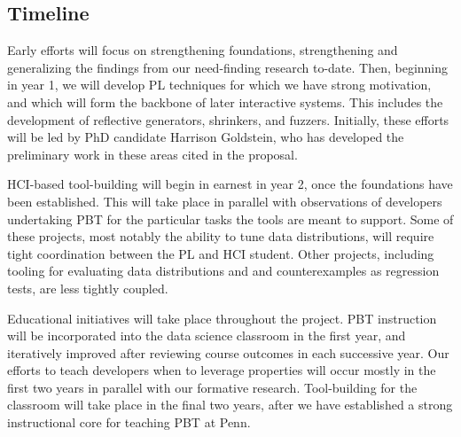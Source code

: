 \subsection*{Timeline}


\iflater
{}

Early efforts will focus on strengthening foundations, strengthening and
generalizing the findings from our need-finding research to-date. Then, beginning in
year 1, we will develop PL techniques for which we have strong
motivation, and which will form the backbone of later interactive systems. This
includes the development of reflective generators, shrinkers, and fuzzers.
Initially, these efforts will be led by PhD candidate Harrison Goldstein, who
has developed the preliminary work in these areas cited in the proposal.

HCI-based tool-building will begin in earnest in year 2, once the
foundations have been established. This will take place in parallel with observations
of developers undertaking PBT for the particular tasks the tools are meant to
support. Some of these projects, most notably the ability to tune data
distributions, will require tight coordination between the PL and HCI student.
Other projects, including tooling for evaluating data distributions and and
counterexamples as regression tests, are less tightly coupled.

Educational initiatives will take place throughout the project. PBT
instruction will be incorporated into the data science classroom in the
first year, and iteratively improved after reviewing course outcomes in each
successive year. Our efforts to teach developers when to leverage properties will
occur mostly in the first two years in parallel with our formative
research. Tool-building for the classroom will take place in the final two
years, after we have established a strong instructional core for teaching PBT at
Penn.
\fi


